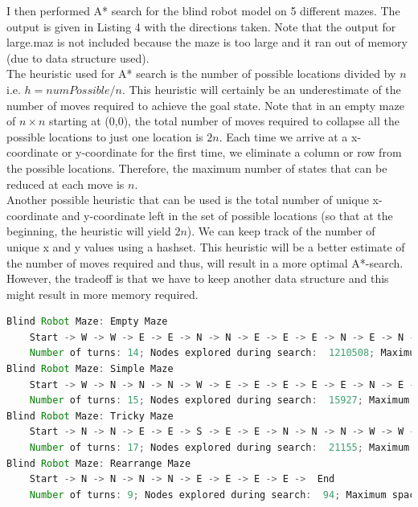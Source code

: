 \documentclass[9.5pt]{extarticle}
\begin{document}
I then performed A* search for the blind robot model on 5 different mazes. The output is given in Listing 4 with the directions taken. Note that the output for large.maz is not included because the maze is too large and it ran out of memory (due to data structure used).\\

The heuristic used for A* search is the number of possible locations divided by $n$ i.e. $h = numPossible / n$. This heuristic will certainly be an underestimate of the number of moves required to achieve the goal state. Note that in an empty maze of $n \times n$ starting at (0,0), the total number of moves required to collapse all the possible locations to just one location is $2n$. Each time we arrive at a x-coordinate or y-coordinate for the first time, we eliminate a column or row from the possible locations. Therefore, the maximum number of states that can be reduced at each move is $n$. \\

Another possible heuristic that can be used is the total number of unique x-coordinate and y-coordinate left in the set of possible locations (so that at the beginning, the heuristic will yield $2n$). We can keep track of the number of unique x and y values using a hashset. This heuristic will be a better estimate of the number of moves required and thus, will result in a more optimal A*-search. However, the tradeoff is that we have to keep another data structure and this might result in more memory required.

\begin{lstlisting}[language=java,caption={Output for A* search of blind robot model for tricky.maz}]
Blind Robot Maze: Empty Maze
    Start -> W -> W -> E -> E -> N -> N -> E -> E -> E -> N -> E -> N -> N ->  End
    Number of turns: 14; Nodes explored during search:  1210508; Maximum space usage: 11654236
Blind Robot Maze: Simple Maze
    Start -> W -> N -> N -> N -> W -> E -> E -> E -> E -> E -> N -> E -> N -> N ->  End
    Number of turns: 15; Nodes explored during search:  15927; Maximum space usage: 113868	
Blind Robot Maze: Tricky Maze
    Start -> N -> N -> E -> E -> S -> E -> E -> N -> N -> N -> W -> W -> W -> W -> W -> W ->  End
    Number of turns: 17; Nodes explored during search:  21155; Maximum space usage: 130927
Blind Robot Maze: Rearrange Maze
    Start -> N -> N -> N -> N -> E -> E -> E -> E ->  End
    Number of turns: 9; Nodes explored during search:  94; Maximum space usage: 644
\end{lstlisting}
\end{document}
